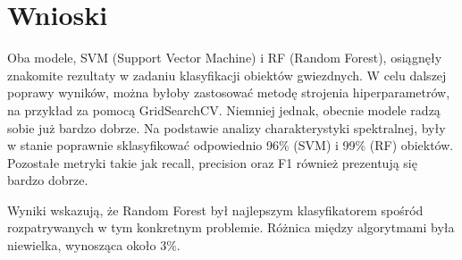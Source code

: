 \documentclass[conference]{IEEEtran}
\begin{document}
\section{Wnioski}
Oba modele, SVM (Support Vector Machine) i RF (Random Forest), osiągnęły znakomite rezultaty w zadaniu klasyfikacji obiektów gwiezdnych. W celu dalszej poprawy wyników, można byłoby zastosować metodę strojenia hiperparametrów, na przykład za pomocą GridSearchCV. Niemniej jednak, obecnie modele radzą sobie już bardzo dobrze. Na podstawie analizy charakterystyki spektralnej, były w stanie poprawnie sklasyfikować odpowiednio 96\% (SVM) i 99\% (RF) obiektów. Pozostałe metryki takie jak recall, precision oraz F1 również prezentują się bardzo dobrze.

Wyniki wskazują, że Random Forest był najlepszym klasyfikatorem spośród rozpatrywanych w tym konkretnym problemie. Różnica między algorytmami była niewielka, wynosząca około 3\%. 
\end{document}
